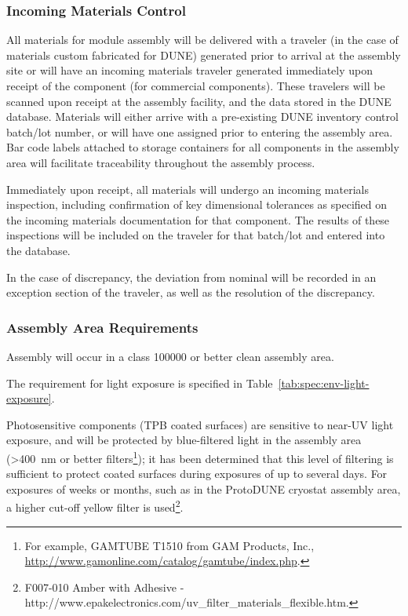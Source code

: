 \subsubsection{Incoming Materials Control}

All materials for  module assembly will be delivered with a  traveler (in the case of materials custom fabricated for DUNE) generated prior to arrival at the assembly site or will have an incoming materials traveler generated immediately upon receipt of the component (for commercial components).  These travelers will be scanned upon receipt at the assembly facility, and the data stored in the DUNE  database.  Materials will either arrive with a pre-existing DUNE inventory control batch/lot number, or will have one assigned prior to entering the assembly area.  Bar code labels attached to storage containers for all components in the assembly area will facilitate traceability throughout the assembly process.

Immediately upon receipt, all materials will undergo an incoming materials inspection, including confirmation of key dimensional tolerances as specified on the incoming materials documentation for that component.  The results of these inspections will be included on the traveler for that batch/lot and entered into the database.

In the case of discrepancy, the deviation from nominal will be recorded in an exception section of the traveler, as well as the resolution of the discrepancy.

\subsubsection{Assembly Area Requirements}

Assembly will occur in a class \num{100000} or better clean assembly area.  

The requirement for light exposure is specified in Table~\ref{tab:spec:env-light-exposure}.


Photosensitive components (TPB coated surfaces) are sensitive to near-UV light exposure, and will be protected by blue-filtered light in the assembly area (>\SI{400}{nm} or better filters\footnote{For example, GAMTUBE T1510 from GAM Products, Inc., \url{http://www.gamonline.com/catalog/gamtube/index.php}.}); it has been determined that this level of filtering is sufficient to protect coated surfaces during  exposures of up to several days. For exposures of weeks or months, such as in the ProtoDUNE cryostat assembly area, a higher cut-off yellow filter is used\footnote{F007-010 Amber with Adhesive - http://www.epakelectronics.com/uv\_filter\_materials\_flexible.htm.}. 


